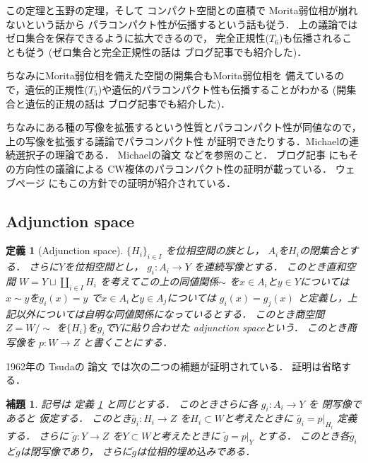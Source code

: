 \documentclass[leqno, a4paper, 12pt]{jsarticle}
\newtheorem{lem}[thm]{補題}
\newtheorem{df}[thm]{定義}
\begin{document}
この定理と玉野の定理，そして
コンパクト空間との直積で
Morita弱位相が崩れないという話から
パラコンパクト性が伝播するという話も従う．
上の議論ではゼロ集合を保存できるように拡大できるので，
完全正規性($T_{6}$)も伝播されることも従う
(ゼロ集合と完全正規性の話は
ブログ記事\cite{Den2}でも紹介した)．

ちなみにMorita弱位相を備えた空間の開集合もMorita弱位相を
備えているので，遺伝的正規性($T_{5}$)や遺伝的パラコンパクト性も伝播することがわかる
(開集合と遺伝的正規の話は
ブログ記事\cite{Den2}でも紹介した)．

ちなみにある種の写像を拡張するという性質とパラコンパクト性が同値なので，上の写像を拡張する議論でパラコンパクト性
が証明できたりする．Michaelの連続選択子の理論である．
Michaelの論文
\cite{MR0077107}などを参照のこと．
ブログ記事
\cite{yamyam}にもその方向性の議論による
CW複体のパラコンパクト性の証明が載っている．
ウェブページ
\cite{mina}
にもこの方針での証明が紹介されている．

\subsection{Adjunction space}
\begin{df}[Adjunction space]\label{df:adj}
$\{H_{i}\}_{i\in I}$
を位相空間の族とし，
$A_{i}$を$H_{i}$の閉集合とする．
さらに$Y$を位相空間とし，
$g_{i}\colon A_{i}\to Y$
を連続写像とする．
このとき直和空間
$W=Y\sqcup \coprod_{i\in I}H_{i}$
を考えてこの上の同値関係$\sim$
を$x\in A_{i}$と$y\in Y$については
$x\sim y$を$g_{i}(x)=y$
で$x\in A_{i}$と$y\in A_{j}$については
$g_{i}(x)=g_{j}(x)$
と定義し，上記以外については自明な同値関係になっているとする．
このとき商空間$Z=W/\sim$
を$\{H_{i}\}$を$g_{i}$で$Y$に貼り合わせた
adjunction spaceという．
このとき商写像を
$p\colon W\to Z$
と書くことにする．
\end{df}

1962年の
Tsudaの
論文
\cite{MR0140085}
では次の二つの補題が証明されている．
証明は省略する．
\begin{lem}\label{lem:adj1}
記号は
定義 
\ref{df:adj}
と同じとする．
このときさらに各
$g_{i}\colon A_{i}\to Y$
を
閉写像であると
仮定する．
このとき$\widetilde{g_{i}}\colon H_{i}\to Z$
を$H_{i}\subset W$と考えたときに
$\widetilde{g_{i}}=p|_{H_{i}}$
定義する．
さらに
$\widetilde{g}\colon Y\to Z$
を$Y\subset W$と考えたときに
$\widetilde{g}=p|_{Y}$
とする．
このとき各$\widetilde{g_{i}}$
と$\widetilde{g}$は閉写像であり，
さらに$\widetilde{g}$は位相的埋め込みである．
\end{lem}
\end{document}
